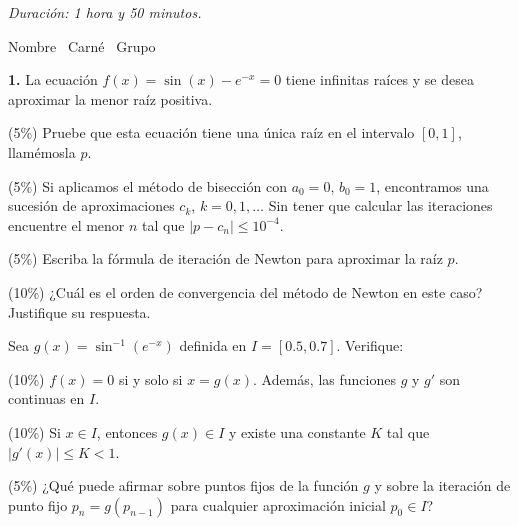 \documentclass[11pt]{article}
\providecommand{\nota}[1]{\par\smallskip\noindent{\small\itshape\color{unalblue}#1}\par\smallskip}
\begin{document}
\examheader

\vspace{4pt}
\noindent\textit{Duración: 1 hora y 50 minutos.}

\vspace{6pt}
\noindent Nombre \dotfill\ Carné \dotfill\ Grupo \dotfill

\vspace{10pt}
\noindent\textbf{1.} La ecuación $f(x)=\sin(x)-e^{-x}=0$ tiene infinitas raíces y se desea aproximar la menor raíz positiva.
\begin{opciones}
\item (5\%) Pruebe que esta ecuación tiene una única raíz en el intervalo $[0,1]$, llamémosla $p$.
\item (5\%) Si aplicamos el método de bisección con $a_0=0$, $b_0=1$, encontramos una sucesión de aproximaciones $c_k$, $k=0,1,\ldots$ Sin tener que calcular las iteraciones encuentre el menor $n$ tal que $|p-c_n|\leq 10^{-4}$.
\item (5\%) Escriba la fórmula de iteración de Newton para aproximar la raíz $p$.
\item (10\%) ¿Cuál es el orden de convergencia del método de Newton en este caso? Justifique su respuesta.
\item Sea $g(x)=\sin^{-1}(e^{-x})$ definida en $I=[0.5,0.7]$. Verifique:
\begin{romanitos}
\item (10\%) $f(x)=0$ si y solo si $x=g(x)$. Además, las funciones $g$ y $g'$ son continuas en $I$.
\item (10\%) Si $x\in I$, entonces $g(x)\in I$ y existe una constante $K$ tal que $|g'(x)|\leq K<1$.
\end{romanitos}
(5\%) ¿Qué puede afirmar sobre puntos fijos de la función $g$ y sobre la iteración de punto fijo $p_n=g(p_{n-1})$ para cualquier aproximación inicial $p_0\in I$?

\nota{AYUDA: $g'(x)=\dfrac{-1}{\left[e^{2x}-1\right]^{\frac12}}$, \quad $g''(x)=\dfrac{e^{2x}}{\left[e^{2x}-1\right]^{\frac32}}$.}
\end{opciones}
\end{document}
